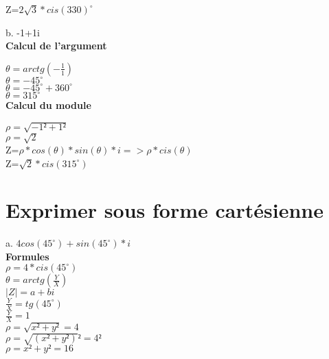 Z=$ 2\sqrt{3} * cis(330)^{\circ} $ \\

\vspace{5mm} %

b.  -1+1i \\

\textbf{Calcul de l'argument} \\
\vspace{3mm} %

$\theta = arctg(-\frac{1} {1})$ \\
$\theta = -45^{\circ}$ \\
$\theta = -45^{\circ} + 360^{\circ}$ \\
$\theta = 315^{\circ}$ \\

\textbf{Calcul du module} \\
\vspace{3mm} %

$\rho = \sqrt{-1²+1²}$ \\
$\rho = \sqrt{2}$ \\

Z=$\rho * cos(\theta)*sin(\theta)*i => \rho * cis(\theta)$ \\

Z=$ \sqrt{2} * cis(315^{\circ}) $ \\

\newpage

\vspace{3mm} %
\section{Exprimer sous forme cartésienne}
\vspace{3mm} %

a. $4cos(45^{\circ}) + sin(45^{\circ}) *i$ \\

\textbf{Formules} \\
$\rho = 4 * cis(45^{\circ})$\\
$\theta = arctg(\frac{Y}{X})$ \\
$|Z| = a+bi $\\

\vspace{3mm} %
$\frac{Y}{X} = tg(45^{\circ})$\\
$\frac{Y}{X} = 1$\\

$\rho = \sqrt{x²+y²} = 4$\\
$\rho = \sqrt{(x²+y²)}² = 4²$\\
$\rho = x²+y² = 16$\\

